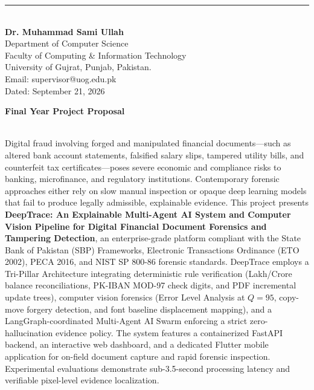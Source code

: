 \documentclass[12pt,a4paper]{article}
\begin{document}
\noindent\rule{6.2cm}{0.75pt}\\[8pt]
\noindent \textbf{Dr. Muhammad Sami Ullah}\\
Department of Computer Science\\
Faculty of Computing \& Information Technology\\
University of Gujrat, Punjab, Pakistan.\\
Email: supervisor@uog.edu.pk\\
Dated: September 21, 2026

\newpage
\setcounter{page}{1}

\begin{center}
{\fontsize{17.2pt}{22pt}\selectfont \textbf{Final Year Project Proposal}}\\[16pt]
\end{center}

\\[8pt]
Digital fraud involving forged and manipulated financial documents---such as altered bank account statements, falsified salary slips, tampered utility bills, and counterfeit tax certificates---poses severe economic and compliance risks to banking, microfinance, and regulatory institutions. Contemporary forensic approaches either rely on slow manual inspection or opaque deep learning models that fail to produce legally admissible, explainable evidence. This project presents \textbf{DeepTrace: An Explainable Multi-Agent AI System and Computer Vision Pipeline for Digital Financial Document Forensics and Tampering Detection}, an enterprise-grade platform compliant with the State Bank of Pakistan (SBP) Frameworks, Electronic Transactions Ordinance (ETO 2002), PECA 2016, and NIST SP 800-86 forensic standards. DeepTrace employs a Tri-Pillar Architecture integrating deterministic rule verification (Lakh/Crore balance reconciliations, PK-IBAN MOD-97 check digits, and PDF incremental update trees), computer vision forensics (Error Level Analysis at $Q=95$, copy-move forgery detection, and font baseline displacement mapping), and a LangGraph-coordinated Multi-Agent AI Swarm enforcing a strict zero-hallucination evidence policy. The system features a containerized FastAPI backend, an interactive web dashboard, and a dedicated Flutter mobile application for on-field document capture and rapid forensic inspection. Experimental evaluations demonstrate sub-3.5-second processing latency and verifiable pixel-level evidence localization.\\[14pt]
\end{document}
